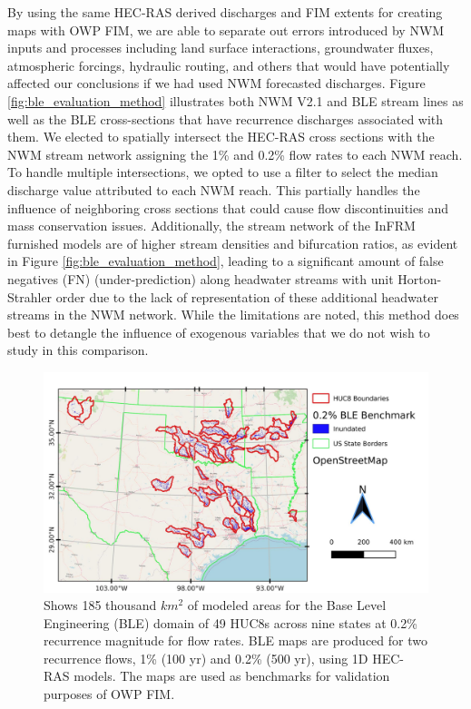 \documentclass[draft]{dependencies/agujournal2019}
\begin{document}
By using the same HEC-RAS derived discharges and FIM extents for creating maps with OWP FIM, we are able to separate out errors introduced by NWM inputs and processes including land surface interactions, groundwater fluxes, atmospheric forcings, hydraulic routing, and others that would have potentially affected our conclusions if we had used NWM forecasted discharges.
Figure \ref{fig:ble_evaluation_method} illustrates both NWM V2.1 and BLE stream lines as well as the BLE cross-sections that have recurrence discharges associated with them.
We elected to spatially intersect the HEC-RAS cross sections with the NWM stream network assigning the 1\% and 0.2\% flow rates to each NWM reach. 
To handle multiple intersections, we opted to use a filter to select the median discharge value attributed to each NWM reach.
This partially handles the influence of neighboring cross sections that could cause flow discontinuities and mass conservation issues.
Additionally, the stream network of the InFRM furnished models are of higher stream densities and bifurcation ratios, as evident in Figure \ref{fig:ble_evaluation_method}, leading to a significant amount of false negatives (FN) (under-prediction) along headwater streams with unit Horton-Strahler order due to the lack of representation of these additional headwater streams in the NWM network.
While the limitations are noted, this method does best to detangle the influence of exogenous variables that we do not wish to study in this comparison.
%
\begin{figure}[H]
\centering
\includegraphics[scale=1.0]{figures/all_ble_maps.jpg}
\caption{
Shows 185 thousand $km^2$ of modeled areas for the Base Level Engineering (BLE) domain of 49 HUC8s across nine states at 0.2\% recurrence magnitude for flow rates.
BLE maps are produced for two recurrence flows, 1\% (100 yr) and 0.2\% (500 yr), using 1D HEC-RAS models.
The maps are used as benchmarks for validation purposes of OWP FIM.
}
\label{fig:all_ble_maps}
\end{figure}
\end{document}
